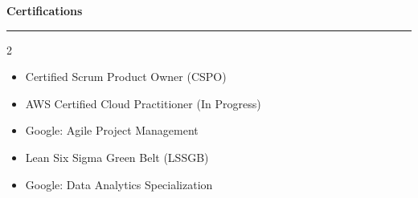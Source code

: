 \documentclass[9pt,letterpaper]{article} %
\newenvironment{rSection}[1]{ %
  \sectionskip
 \textbf{\Large #1} %
  \sectionlineskip
  \hrule %
  \begin{list}{}{ %
    \setlength{\leftmargin}{-0em} %
  }
  \item[]
}{
  \end{list}
}
\def\sectionlineskip{\smallskip} %
\def\sectionskip{} %
\begin{document}
\begin{rSection}{Certifications}
\begin{multicols}{2}
\begin{itemize}[left=-1.5em, labelsep=.1cm, labelwidth=.2cm, itemsep=0.0em, topsep=0pt]
\item Certified Scrum Product Owner (CSPO)
\item AWS Certified Cloud Practitioner (In Progress)
\item Google: Agile Project Management
\item Lean Six Sigma Green Belt (LSSGB)
\item Google: Data Analytics Specialization
\end{itemize}
\end{multicols}
\end{rSection}
\end{document}
